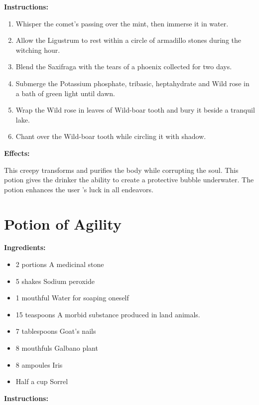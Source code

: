 \documentclass{article}
\begin{document}
\textbf{Instructions:}

\begin{enumerate}
  \item Whisper the comet’s passing over the mint, then immerse it in water.
  \item Allow the Ligustrum to rest within a circle of armadillo stones during the witching hour.
  \item Blend the Saxifraga with the tears of a phoenix collected for two days.
  \item Submerge the Potassium phosphate, tribasic, heptahydrate and Wild rose in a bath of green light until dawn.
  \item Wrap the Wild rose in leaves of Wild-boar tooth and bury it beside a tranquil lake.
  \item Chant over the Wild-boar tooth while circling it with shadow.
\end{enumerate}

\textbf{Effects:}

This creepy transforms and purifies the body while corrupting the soul. This potion gives the drinker the ability to create a protective bubble underwater. The potion enhances the user 's luck in all endeavors.

\newpage
\section*{Potion of Agility}

\textbf{Ingredients:}

\begin{itemize}
  \item 2 portions A medicinal stone
  \item 5 shakes Sodium peroxide
  \item 1 mouthful Water for soaping oneself
  \item 15 teaspoons A morbid substance produced in land animals.
  \item 7 tablespoons Goat's nails
  \item 8 mouthfuls Galbano plant
  \item 8 ampoules Iris
  \item Half a cup Sorrel
\end{itemize}

\textbf{Instructions:}
\end{document}
